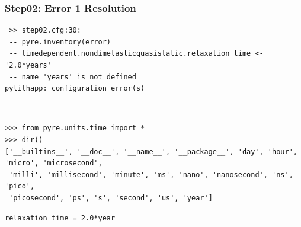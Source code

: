 \documentclass{beamer}
\begin{document}
\begin{frame}[fragile]
  \frametitle{Step02: Error 1 Resolution}

\begin{lstlisting}
 >> step02.cfg:30:
 -- pyre.inventory(error)
 -- timedependent.nondimelasticquasistatic.relaxation_time <- '2.0*years'
 -- name 'years' is not defined
pylithapp: configuration error(s)
\end{lstlisting}\pause
{} \pause\\
\begin{lstlisting}
>>> from pyre.units.time import *
>>> dir()
['__builtins__', '__doc__', '__name__', '__package__', 'day', 'hour', 'micro', 'microsecond',
 'milli', 'millisecond', 'minute', 'ms', 'nano', 'nanosecond', 'ns', 'pico',
 'picosecond', 'ps', 's', 'second', 'us', 'year']
\end{lstlisting}
\begin{lstlisting}
relaxation_time = 2.0*year
\end{lstlisting}

\end{frame}
\end{document}
